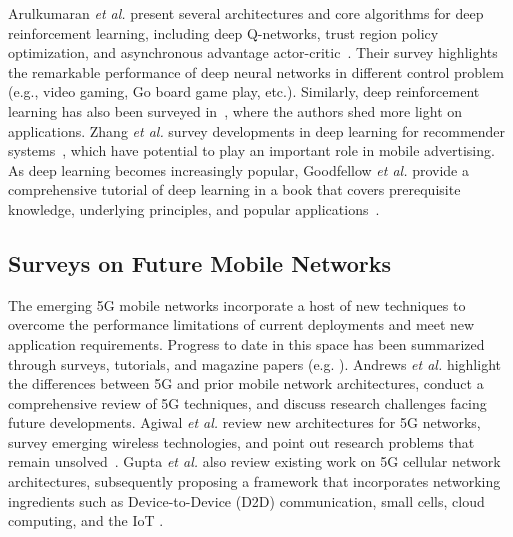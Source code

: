 \documentclass[journal,comsoc,letter]{IEEEtran}
\newcommand{\edit}[1]{\textcolor{black}{#1}}
\begin{document}
Arulkumaran \emph{et al.} present several architectures and core algorithms for deep reinforcement learning, including deep Q-networks, trust region policy optimization, and asynchronous advantage actor-critic~\cite{kai2017brief}. Their survey highlights the remarkable performance of deep neural networks in different control problem (e.g., video gaming, Go board game play, etc.). Similarly, deep reinforcement learning has also been surveyed in~\cite{li2017deeprl}, where the authors shed more light on applications. Zhang \emph{et al.} survey developments in deep learning for recommender systems~\cite{zhang2017deep}, which have potential to play an important role in mobile advertising. As deep learning becomes increasingly popular, Goodfellow \emph{et al.} provide a comprehensive tutorial of deep learning in a book that covers prerequisite knowledge, underlying principles, and popular applications~\cite{goodfellow2016deep}. 

\subsection{Surveys on Future Mobile Networks}
The emerging 5G mobile networks incorporate a host of new techniques to overcome the performance limitations of current deployments and meet new application requirements. Progress to date in this space has been summarized through surveys, tutorials, and magazine papers (e.g. \cite{andrews2014will, agiwal2016next, gupta2015survey, panwar2016survey, mao2017survey}).  
Andrews \emph{et al.} highlight the differences between 5G and prior mobile network architectures, conduct a comprehensive review of 5G techniques, and discuss research challenges facing future developments\edit{\cite{andrews2014will}}. Agiwal \emph{et al.} review new architectures for 5G networks, survey emerging wireless technologies, and point out research problems that remain unsolved~\cite{agiwal2016next}. Gupta \emph{et al.} also review existing work on 5G cellular network architectures, subsequently proposing a framework that incorporates networking ingredients such as Device-to-Device (D2D) communication, small cells, cloud computing, and the IoT \cite{gupta2015survey}.
\end{document}
